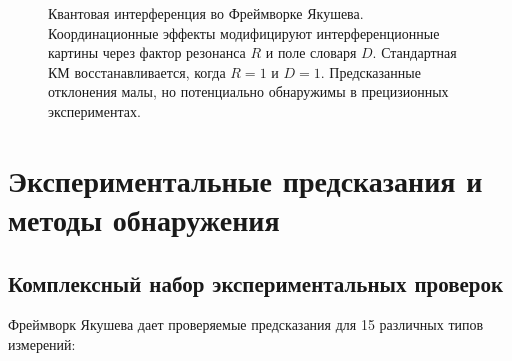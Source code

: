 \documentclass[11pt,a4paper]{article}
\begin{document}
\begin{figure}[htbp]
{
		}
		\caption{Квантовая интерференция во Фреймворке Якушева. Координационные эффекты модифицируют интерференционные картины через фактор резонанса $R$ и поле словаря $D$. Стандартная КМ восстанавливается, когда $R=1$ и $D=1$. Предсказанные отклонения малы, но потенциально обнаружимы в прецизионных экспериментах.}
		\label{fig:quantum-interference}
	\end{figure}
	
	\section{Экспериментальные предсказания и методы обнаружения}
	\subsection{Комплексный набор экспериментальных проверок}
	
	Фреймворк Якушева дает проверяемые предсказания для 15 различных типов измерений:
	
\end{document}
